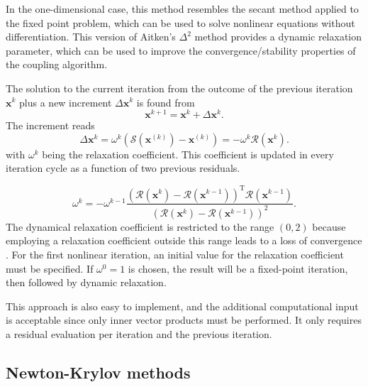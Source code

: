           In the one-dimensional case, this method resembles the secant method applied to the fixed point problem, which can be used to solve nonlinear equations without differentiation.
          This version of Aitken's \(\Delta^2\) method provides a dynamic relaxation parameter, which can be used to improve the convergence/stability properties of the coupling algorithm.

          The solution to the current iteration from the outcome of the previous iteration $\mathbf{x}^{k}$ plus a new increment $\Delta \mathbf{x}^{k}$ is found from
          \begin{equation}
            \mathbf{x}^{k+1}=\mathbf{x}^{k}+\Delta \mathbf{x}^{k}.
          \end{equation}
          The increment reads
          \begin{equation} \label{eq:aitken_update}
            \Delta \mathbf{x}^{k}=\omega^{k}\left(\bm{\mathcal{S}}(\mathbf{x}^{(k)})-\mathbf{x}^{(k)}\right)=-\omega^{k} \bm{\mathcal{R}}(\mathbf{x}^k).
          \end{equation}
          with $\omega^{k}$ being the relaxation coefficient.
          This coefficient is updated in every iteration cycle as a function of two previous residuals.

          \begin{equation} \label{eq:aitken_relaxation_factor}
            \omega^{k}=-\omega^{k-1} \frac{\left(\bm{\mathcal{R}}(\mathbf{x}^k)-\bm{\mathcal{R}}(\mathbf{x}^{k-1})\right)^{\mathrm{T}} \bm{\mathcal{R}}(\mathbf{x}^{k-1})}{\left(\bm{\mathcal{R}}(\mathbf{x}^k)-\bm{\mathcal{R}}(\mathbf{x}^{k-1})\right)^{2}}.
          \end{equation}
          The dynamical relaxation coefficient is restricted to the range \((0,2)\) because employing a relaxation coefficient outside this range leads to a loss of convergence \citep{erbts_accelerated_2012}.
          For the first nonlinear iteration, an initial value for the relaxation coefficient must be specified.
          If $\omega^{0}=1$ is chosen, the result will be a fixed-point iteration, then followed by dynamic relaxation.

          This approach is also easy to implement, and the additional computational input is acceptable since only inner vector products must be performed.
          It only requires a residual evaluation per iteration and the previous iteration.

          \subsection{Newton-Krylov methods} \label{sec:newton_krylov}

